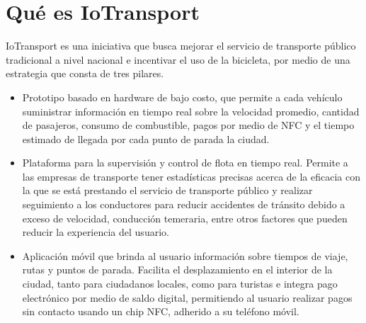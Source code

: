 \documentclass[letterpaper]{twentysecondcv} %
\begin{document}
\makeprofile %
 

\section{Qué es IoTransport}

\begin{twenty} %
\twentyitem
    	{}
    	{}
        {IoTransport es una iniciativa que busca mejorar el servicio de transporte público tradicional a nivel nacional e incentivar el uso de la bicicleta, por medio de una estrategia que consta de tres pilares.}
        {{}}
        {}
        {\begin{itemize}
        \item Prototipo basado en hardware de bajo costo, que permite a cada vehículo suministrar información en tiempo real sobre la velocidad promedio, cantidad de pasajeros, consumo de combustible, pagos por medio de NFC y el tiempo estimado de llegada por cada punto de parada la ciudad. \\
        \item Plataforma para la supervisión y control de flota en tiempo real. Permite a las empresas de transporte tener estadísticas precisas acerca de la eficacia con la que se está prestando el servicio de transporte público y realizar seguimiento a los conductores para reducir accidentes de tránsito debido a exceso de velocidad, conducción temeraria, entre otros factores que pueden reducir la experiencia del usuario. \\
        \item Aplicación móvil que brinda al usuario información sobre tiempos de viaje, rutas y puntos de parada. Facilita el desplazamiento en el interior de la ciudad, tanto para ciudadanos locales, como para turistas e integra pago electrónico por medio de saldo digital, permitiendo al usuario realizar pagos sin contacto usando un chip NFC, adherido a su teléfono móvil.
        \end{itemize}}
        \\

        
\end{twenty}

\end{document}
